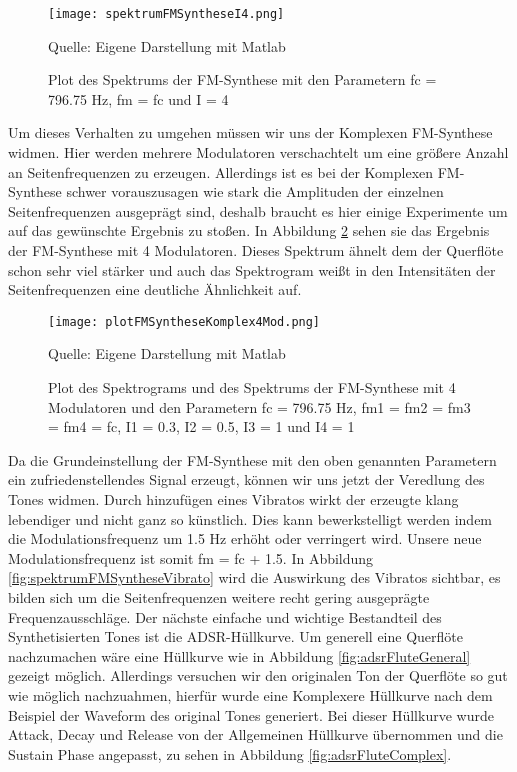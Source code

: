 \begin{figure} [ht]
\centering
  \texttt{[image: spektrumFMSyntheseI4.png]}
\caption{Plot des Spektrums der FM-Synthese mit den Parametern fc = 796.75 Hz, fm = fc und I = 4}
\label{fig:spektrumFMSyntheseI4}
Quelle: Eigene Darstellung mit Matlab
\end{figure}

Um dieses Verhalten zu umgehen müssen wir uns der Komplexen FM-Synthese widmen. Hier werden mehrere Modulatoren verschachtelt um eine größere Anzahl an Seitenfrequenzen zu erzeugen. Allerdings ist es bei der Komplexen FM-Synthese schwer vorauszusagen wie stark die Amplituden der einzelnen Seitenfrequenzen ausgeprägt sind, deshalb braucht es hier einige Experimente um auf das gewünschte Ergebnis zu stoßen. In Abbildung \ref{fig:plotFMSyntheseKomplex4Mod} sehen sie das Ergebnis der FM-Synthese mit 4 Modulatoren. Dieses Spektrum ähnelt dem der Querflöte schon sehr viel stärker und auch das Spektrogram weißt in den Intensitäten der Seitenfrequenzen eine deutliche Ähnlichkeit auf.

\begin{figure} [ht]
\centering
  \texttt{[image: plotFMSyntheseKomplex4Mod.png]}
\caption{Plot des Spektrograms und des Spektrums der FM-Synthese mit 4 Modulatoren und den Parametern fc = 796.75 Hz, fm1 = fm2 = fm3 = fm4 = fc, I1 = 0.3, I2 = 0.5, I3 = 1 und I4 = 1}
\label{fig:plotFMSyntheseKomplex4Mod}
Quelle: Eigene Darstellung mit Matlab
\end{figure}

Da die Grundeinstellung der FM-Synthese mit den oben genannten Parametern ein zufriedenstellendes Signal erzeugt, können wir uns jetzt der Veredlung des Tones widmen. Durch hinzufügen eines Vibratos wirkt der erzeugte klang lebendiger und nicht ganz so künstlich. Dies kann bewerkstelligt werden indem die Modulationsfrequenz um 1.5 Hz erhöht oder verringert wird. Unsere neue Modulationsfrequenz ist somit fm = fc + 1.5. In Abbildung \ref{fig:spektrumFMSyntheseVibrato} wird die Auswirkung des Vibratos sichtbar, es bilden sich um die Seitenfrequenzen weitere recht gering ausgeprägte Frequenzausschläge. Der nächste einfache und wichtige Bestandteil des Synthetisierten Tones ist die ADSR-Hüllkurve. Um generell eine Querflöte nachzumachen wäre eine Hüllkurve wie in Abbildung \ref{fig:adsrFluteGeneral} gezeigt möglich. Allerdings versuchen wir den originalen Ton der Querflöte so gut wie möglich nachzuahmen, hierfür wurde eine Komplexere Hüllkurve nach dem Beispiel der Waveform des original Tones generiert. Bei dieser Hüllkurve wurde Attack, Decay und Release von der Allgemeinen Hüllkurve übernommen und die Sustain Phase angepasst, zu sehen in Abbildung \ref{fig:adsrFluteComplex}. 

